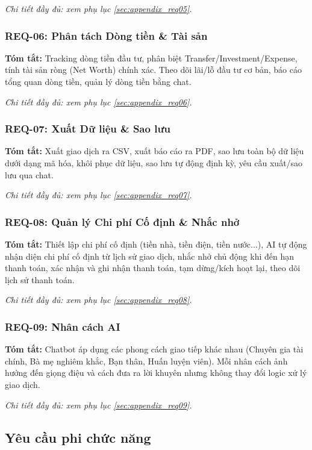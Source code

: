 \textit{Chi tiết đầy đủ: xem phụ lục \ref{sec:appendix_req05}.}

\subsubsection{REQ-06: Phân tách Dòng tiền \& Tài sản}
\textbf{Tóm tắt:} Tracking dòng tiền đầu tư, phân biệt Transfer/Investment/Expense, tính tài sản ròng (Net Worth) chính xác. Theo dõi lãi/lỗ đầu tư cơ bản, báo cáo tổng quan dòng tiền, quản lý dòng tiền bằng chat.

\textit{Chi tiết đầy đủ: xem phụ lục \ref{sec:appendix_req06}.}

\subsubsection{REQ-07: Xuất Dữ liệu \& Sao lưu}
\textbf{Tóm tắt:} Xuất giao dịch ra CSV, xuất báo cáo ra PDF, sao lưu toàn bộ dữ liệu dưới dạng mã hóa, khôi phục dữ liệu, sao lưu tự động định kỳ, yêu cầu xuất/sao lưu qua chat.

\textit{Chi tiết đầy đủ: xem phụ lục \ref{sec:appendix_req07}.}

\subsubsection{REQ-08: Quản lý Chi phí Cố định \& Nhắc nhở}
\textbf{Tóm tắt:} Thiết lập chi phí cố định (tiền nhà, tiền điện, tiền nước...), AI tự động nhận diện chi phí cố định từ lịch sử giao dịch, nhắc nhở chủ động khi đến hạn thanh toán, xác nhận và ghi nhận thanh toán, tạm dừng/kích hoạt lại, theo dõi lịch sử thanh toán.

\textit{Chi tiết đầy đủ: xem phụ lục \ref{sec:appendix_req08}.}

\subsubsection{REQ-09: Nhân cách AI}
\textbf{Tóm tắt:} Chatbot áp dụng các phong cách giao tiếp khác nhau (Chuyên gia tài chính, Bà mẹ nghiêm khắc, Bạn thân, Huấn luyện viên). Mỗi nhân cách ảnh hưởng đến giọng điệu và cách đưa ra lời khuyên nhưng không thay đổi logic xử lý giao dịch.

\textit{Chi tiết đầy đủ: xem phụ lục \ref{sec:appendix_req09}.}

\subsection{Yêu cầu phi chức năng}
\label{subsec:non_functional_requirements}

